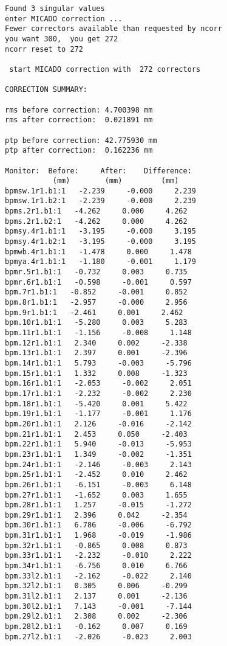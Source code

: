 \begin{verbatim}
Found 3 singular values
enter MICADO correction ...
Fewer correctors available than requested by ncorr
you want 300,  you get 272
ncorr reset to 272
  
 start MICADO correction with  272 correctors
  
CORRECTION SUMMARY:   

rms before correction: 4.700398 mm
rms after correction:  0.021891 mm

ptp before correction: 42.775930 mm
ptp after correction:  0.162236 mm

Monitor:  Before:     After:    Difference:
           (mm)        (mm)         (mm)   
bpmsw.1r1.b1:1   -2.239     -0.000     2.239
bpmsw.1r1.b2:1   -2.239     -0.000     2.239
bpms.2r1.b1:1   -4.262     0.000     4.262
bpms.2r1.b2:1   -4.262     0.000     4.262
bpmsy.4r1.b1:1   -3.195     -0.000     3.195
bpmsy.4r1.b2:1   -3.195     -0.000     3.195
bpmwb.4r1.b1:1   -1.478     0.000     1.478
bpmya.4r1.b1:1   -1.180     -0.001     1.179
bpmr.5r1.b1:1   -0.732     0.003     0.735
bpmr.6r1.b1:1   -0.598     -0.001     0.597
bpm.7r1.b1:1   -0.852     -0.001     0.852
bpm.8r1.b1:1   -2.957     -0.000     2.956
bpm.9r1.b1:1   -2.461     0.001     2.462
bpm.10r1.b1:1   -5.280     0.003     5.283
bpm.11r1.b1:1   -1.156     -0.008     1.148
bpm.12r1.b1:1   2.340     0.002     -2.338
bpm.13r1.b1:1   2.397     0.001     -2.396
bpm.14r1.b1:1   5.793     -0.003     -5.796
bpm.15r1.b1:1   1.332     0.008     -1.323
bpm.16r1.b1:1   -2.053     -0.002     2.051
bpm.17r1.b1:1   -2.232     -0.002     2.230
bpm.18r1.b1:1   -5.420     0.001     5.422
bpm.19r1.b1:1   -1.177     -0.001     1.176
bpm.20r1.b1:1   2.126     -0.016     -2.142
bpm.21r1.b1:1   2.453     0.050     -2.403
bpm.22r1.b1:1   5.940     -0.013     -5.953
bpm.23r1.b1:1   1.349     -0.002     -1.351
bpm.24r1.b1:1   -2.146     -0.003     2.143
bpm.25r1.b1:1   -2.452     0.010     2.462
bpm.26r1.b1:1   -6.151     -0.003     6.148
bpm.27r1.b1:1   -1.652     0.003     1.655
bpm.28r1.b1:1   1.257     -0.015     -1.272
bpm.29r1.b1:1   2.396     0.042     -2.354
bpm.30r1.b1:1   6.786     -0.006     -6.792
bpm.31r1.b1:1   1.968     -0.019     -1.986
bpm.32r1.b1:1   -0.865     0.008     0.873
bpm.33r1.b1:1   -2.232     -0.010     2.222
bpm.34r1.b1:1   -6.756     0.010     6.766
bpm.33l2.b1:1   -2.162     -0.022     2.140
bpm.32l2.b1:1   0.305     0.006     -0.299
bpm.31l2.b1:1   2.137     0.001     -2.136
bpm.30l2.b1:1   7.143     -0.001     -7.144
bpm.29l2.b1:1   2.308     0.002     -2.306
bpm.28l2.b1:1   -0.162     0.007     0.169
bpm.27l2.b1:1   -2.026     -0.023     2.003

\end{verbatim}
